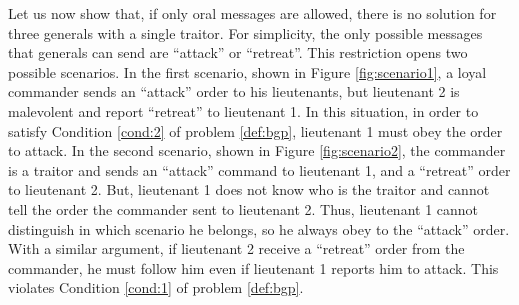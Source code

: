 \bigskip
\noindent
Let us now show that, if only oral messages are allowed, there is no solution for three generals with a single traitor. For simplicity, the only possible messages that generals can send are \enquote{attack} or \enquote{retreat}. This restriction opens two possible scenarios. In the first scenario, shown in Figure \ref{fig:scenario1}, a loyal commander sends an \enquote{attack} order to his lieutenants, but lieutenant 2 is malevolent and report \enquote{retreat} to lieutenant 1. In this situation, in order to satisfy Condition \ref{cond:2} of problem \ref{def:bgp}, lieutenant 1 must obey the order to attack. In the second scenario, shown in Figure \ref{fig:scenario2}, the commander is a traitor and sends an \enquote{attack} command to lieutenant 1, and a \enquote{retreat} order to lieutenant 2. But, lieutenant 1 does not know who is the traitor and cannot tell the order the commander sent to lieutenant 2. Thus, lieutenant 1 cannot distinguish in which scenario he belongs, so he always obey to the \enquote{attack} order. With a similar argument, if lieutenant 2 receive a \enquote{retreat} order from the commander, he must follow him even if lieutenant 1 reports him to attack. This violates Condition \ref{cond:1} of problem \ref{def:bgp}.


